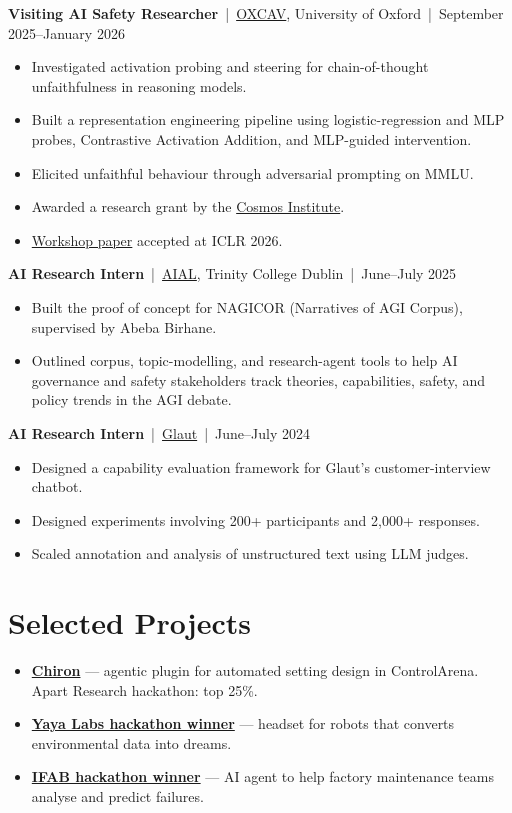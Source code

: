 \documentclass[10pt,a4paper]{article}
\newcommand{\role}[3]{\par\addvspace{6pt}%
  \textbf{#1}~|~#2~|~#3\par}
\begin{document}
\role{Visiting AI Safety Researcher}{\href{https://oxcav.web.ox.ac.uk/}{OXCAV}, University of Oxford}{September 2025--January 2026}
\begin{itemize}
  \item Investigated activation probing and steering for chain-of-thought unfaithfulness in reasoning models.
  \item Built a representation engineering pipeline using logistic-regression and MLP probes, Contrastive Activation Addition, and MLP-guided intervention.
  \item Elicited unfaithful behaviour through adversarial prompting on MMLU.
  \item Awarded a research grant by the \href{https://cosmos-institute.org/}{Cosmos Institute}.
  \item \href{https://openreview.net/forum?id=LocRunEIxK}{Workshop paper} accepted at ICLR 2026.
\end{itemize}

\role{AI Research Intern}{\href{https://aial.ie/}{AIAL}, Trinity College Dublin}{June--July 2025}
\begin{itemize}
  \item Built the proof of concept for NAGICOR (Narratives of AGI Corpus), supervised by Abeba Birhane.
  \item Outlined corpus, topic-modelling, and research-agent tools to help AI governance and safety stakeholders track theories, capabilities, safety, and policy trends in the AGI debate.
\end{itemize}

\role{AI Research Intern}{\href{https://www.glaut.com/}{Glaut}}{June--July 2024}
\begin{itemize}
  \item Designed a capability evaluation framework for Glaut's customer-interview chatbot.
  \item Designed experiments involving 200+ participants and 2,000+ responses.
  \item Scaled annotation and analysis of unstructured text using LLM judges.
\end{itemize}

\section*{Selected Projects}
\begin{itemize}
  \item \href{https://github.com/Joe-Occhipinti/Chiron-ControlArena}{\textbf{Chiron}} --- agentic plugin for automated setting design in ControlArena. Apart Research hackathon: top 25\%.
  \item \href{https://www.instagram.com/p/C-dNyj1NoE0/}{\textbf{Yaya Labs hackathon winner}} --- headset for robots that converts environmental data into dreams.
  \item \href{https://www.ifabfoundation.org/2024/06/07/the-2024-edition-of-ifab-4-next-generation-talents-comes-to-a-close-young-talents-ideas-to-tackle-future-challenges-with-supercomputing-technologies/}{\textbf{IFAB hackathon winner}} --- AI agent to help factory maintenance teams analyse and predict failures.
\end{itemize}
\end{document}
